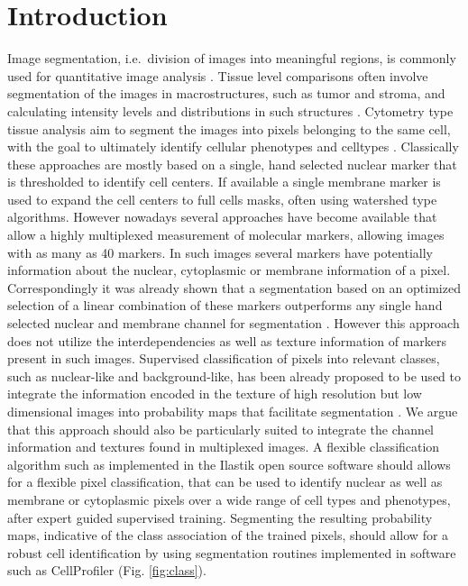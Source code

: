 \documentclass[a4paper]{article}
\begin{document}
\section{Introduction}
Image segmentation, i.e.\ division of images into meaningful regions, is
commonly  used for quantitative image analysis \cite{carpenter_cellprofiler:_2006,mccabe_automated_2005}.  Tissue level comparisons often
involve segmentation of the images in macrostructures, such as tumor and stroma, and calculating
intensity levels and distributions in such structures \cite{mccabe_automated_2005}.  Cytometry type tissue analysis aim to
segment the images into pixels belonging to the same cell, with the goal to ultimately identify
cellular phenotypes and celltypes \cite{carpenter_cellprofiler:_2006}.  Classically these approaches are mostly based on a single, hand
selected nuclear marker that is thresholded to identify cell centers. If available a single membrane
marker is used to expand the cell centers to full cells masks, often using watershed type algorithms.  However
nowadays several approaches have become available that allow a highly multiplexed measurement of
molecular markers, allowing images with as many as 40 markers. In such images several markers have
potentially information about the nuclear, cytoplasmic or membrane information of a pixel.  Correspondingly it
was already shown that a segmentation based on an optimized selection of a linear combination of
these markers outperforms any single hand selected nuclear and membrane channel for segmentation
\cite{schuffler_single_2014}. However this approach does not utilize the interdependencies as well as texture
information of markers present in such images. Supervised classification of pixels into relevant classes, such as
nuclear-like and background-like, has been already proposed to be used to integrate the information
encoded in the texture of high resolution but low dimensional images into probability maps that facilitate segmentation
\cite{joyseeree_using_2013,sommer_learning-based_2012-1,logan_quantifying_2016, sommer_ilastik:_2011}.
We argue that this approach should also be particularly suited to
integrate the channel information and textures found in multiplexed images. A flexible classification algorithm such as implemented in the Ilastik open source software should allows for a
flexible pixel classification, that can be used to identify nuclear as well as membrane or
cytoplasmic pixels over a wide range of cell types and phenotypes, after expert guided supervised
training. Segmenting the resulting probability maps, indicative of the class association of the
trained pixels, should allow for a robust cell identification by using segmentation routines
implemented in software such as CellProfiler (Fig. \ref{fig:class}).
\end{document}
